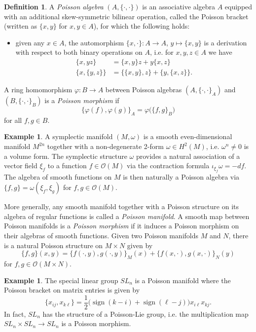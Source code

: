 \documentclass{amsart}
\theoremstyle{definition}
\newtheorem{definition}[theorem]{Definition}
\newtheorem{example}[theorem]{Example}
\theoremstyle{remark}
\numberwithin{equation}{section}
\newcommand{\cO}{{\mathcal{O}}}
\newcommand{\sgn}{\operatorname{sign}}
\begin{document}
  \begin{definition}
    A \emph{Poisson algebra} $(A,\{\cdot,\cdot\})$ is an associative algebra $A$ equipped with an additional skew-symmetric bilinear operation, called the Poisson bracket (written as $\{x,y\}$ for $x,y\in A$), for which the following holds:
    \begin{itemize}
      \item given any $x\in A$, the automorphism $\{x,\cdot\}:A\to A$, $y\mapsto\{x,y\}$ is a derivation with respect to both binary operations on $A$, i.e. for $x,y,z\in A$ we have
      \begin{align*}
        \tag{Leibnitz rule} \{x,yz\}&=\{x,y\}z+y\{x,z\}\\
        \tag{Jacobi identity}\{x,\{y,z\}\}&=\{\{x,y\},z\}+\{y,\{x,z\}\}.
      \end{align*}
    \end{itemize}
    A ring homomorphism $\varphi:B\to A$ between Poisson algebras $(A,\{\cdot,\cdot\}_A)$ and $(B,\{\cdot,\cdot\}_B)$ is a \emph{Poisson morphism} if
    \[\{\varphi(f),\varphi(g)\}_A=\varphi\big(\{f,g\}_B\big)\]
    for all $f,g\in B$.
  \end{definition}

  \begin{example}
    A symplectic manifold $(M,\omega)$ is a smooth even-dimensional manifold $M^{2n}$ together with a non-degenerate 2-form $\omega\in H^2(M)$, i.e. $\omega^n\ne0$ is a volume form.  The symplectic structure $\omega$ provides a natural association of a vector field $\xi_f$ to a function $f\in\cO(M)$ via the contraction formula $\iota_{\xi_f}\omega=-df$.  The algebra of smooth functions on $M$ is then naturally a Poisson algebra via $\{f,g\}=\omega(\xi_f,\xi_g)$ for $f,g\in\cO(M)$.
  \end{example}
  More generally, any smooth manifold together with a Poisson structure on its algebra of regular functions is called a \emph{Poisson manifold}.  A smooth map between Poisson manifolds is a \emph{Poisson morphism} if it induces a Poisson morphism on their algebras of smooth functions.  Given two Poisson manifolds $M$ and $N$, there is a natural Poisson structure on $M\times N$ given by
  \[\{f,g\}(x,y)=\{f(\cdot,y),g(\cdot,y)\}_M(x)+\{f(x,\cdot),g(x,\cdot)\}_N(y)\]
  for $f,g\in\cO(M\times N)$.
  \begin{example}
    The special linear group $SL_n$ is a Poisson manifold where the Poisson bracket on matrix entries is given by
    \begin{equation}
      \{x_{ij},x_{k\ell}\}=\frac{1}{2}\big(\sgn(k-i)+\sgn(\ell-j)\big)x_{i\ell}x_{kj}.
    \end{equation}
    In fact, $SL_n$ has the structure of a Poisson-Lie group, i.e. the multiplication map $SL_n\times SL_n\to SL_n$ is a Poisson morphism.
  \end{example}
\end{document}
